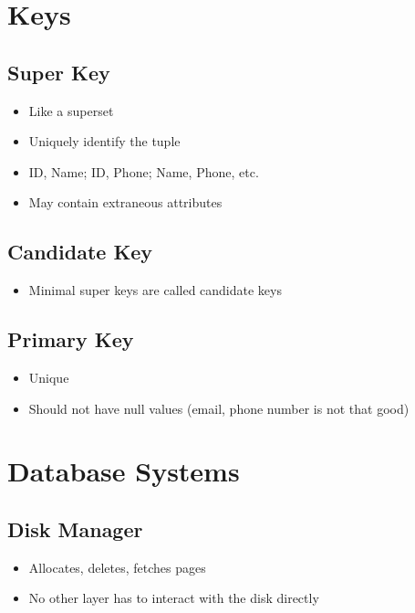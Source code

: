 \documentclass{article}
\begin{document}
\section{Keys}

\subsection{Super Key}

\begin{itemize}
    \item Like a superset
    \item Uniquely identify the tuple
    \item ID, Name; ID, Phone; Name, Phone, etc.
    \item May contain extraneous attributes
\end{itemize}

\subsection{Candidate Key}

\begin{itemize}
    \item Minimal super keys are called candidate keys
\end{itemize}

\subsection{Primary Key}

\begin{itemize}
    \item Unique
    \item Should not have null values (email, phone number is not that good)
\end{itemize}

\section{Database Systems}

\subsection{Disk Manager}

\begin{itemize}
    \item Allocates, deletes, fetches pages
    \item No other layer has to interact with the disk directly
\end{itemize}
\end{document}
